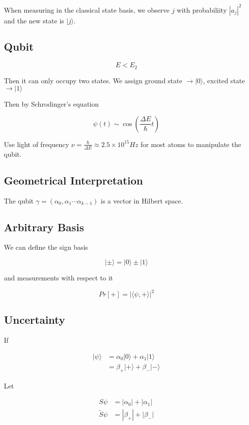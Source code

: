 \documentclass{article}
\newcommand{\<}{\langle}
\renewcommand{\>}{\rangle}
\newcommand{\q}[1] {|{#1 \rangle}}
\begin{document}
When measuring in the classical state basis, we observe $j$ with probabiliity $|a_j|^2$ and the new state is $\q{j}$.

\subsection{Qubit}

$$
E < E_2
$$

Then it can only occupy two states. We assign ground state $\to \q{0}$, excited state $\to \q{1}$

Then by Schrodinger's equation

$$
\psi(t) \sim \cos\left(\frac{\Delta E}{\hbar} t\right)
$$

Use light of frequency $\nu = \frac{\hbar}{\Delta E} \approx 2.5 \times 10^{15} Hz$ for most atoms to manipulate the qubit.

\subsection{Geometrical Interpretation}

The qubit $\gamma = (\alpha_0, \alpha_1 \cdots \alpha_{k-1})$ is a vector in Hilbert space.

\subsection{Arbitrary Basis}

We can define the sign basis

$$
\q{\pm} = \q{0} \pm \q{1}
$$

and measurements with respect to it

$$
Pr[+] = |\< \psi, + \>|^2
$$

\subsection{Uncertainty}

If

\begin{align}
\q{\psi} &= \alpha_0 \q{0} + \alpha_1 \q{1} \\
&= \beta_+ \q{+} + \beta_- \q{-}
\end{align}

Let

\begin{align}
S\psi &= |\alpha_0| + |\alpha_1| \\
\tilde{S}\psi &= |\beta_+| + |\beta_-|
\end{align}
\end{document}
